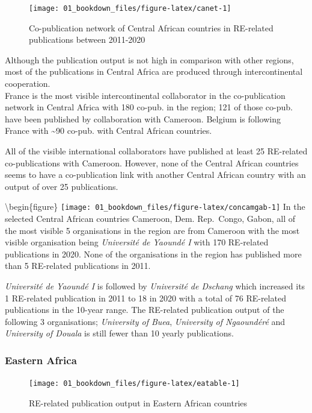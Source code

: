 \documentclass[
]{book}
\begin{document}
\begin{figure}
\texttt{[image: 01\_bookdown\_files/figure-latex/canet-1]} \caption{Co-publication network of Central African countries in RE-related publications between 2011-2020}\label{fig:canet}
\end{figure}

Although the publication output is not high in comparison with other regions, most of the publications in Central Africa are produced through intercontinental cooperation.\\
France is the most visible intercontinental collaborator in the co-publication network in Central Africa with 180 co-pub. in the region; 121 of those co-pub. have been published by collaboration with Cameroon. Belgium is following France with \textasciitilde90 co-pub. with Central African countries.

All of the visible international collaborators have published at least 25 RE-related co-publications with Cameroon. However, none of the Central African countries seems to have a co-publication link with another Central African country with an output of over 25 publications.

\textbackslash begin\{figure\}
\texttt{[image: 01\_bookdown\_files/figure-latex/concamgab-1]}
In the selected Central African countries Cameroon, Dem. Rep.~Congo, Gabon, all of the most visible 5 organisations in the region are from Cameroon with the most visible organisation being \emph{Université de Yaoundé I} with 170 RE-related publications in 2020. None of the organisations in the region has published more than 5 RE-related publications in 2011.

\emph{Université de Yaoundé I} is followed by \emph{Université de Dschang} which increased its 1 RE-related publication in 2011 to 18 in 2020 with a total of 76 RE-related publications in the 10-year range. The RE-related publication output of the following 3 organisations; \emph{University of Buea}, \emph{University of Ngaoundéré} and \emph{University of Douala} is still fewer than 10 yearly publications.

\hypertarget{eastern-africa}{%
\subsubsection{Eastern Africa}\label{eastern-africa}}

\begin{figure}
\texttt{[image: 01\_bookdown\_files/figure-latex/eatable-1]} \caption{RE-related publication output in Eastern African countries}\label{fig:eatable}
\end{figure}
\end{document}
